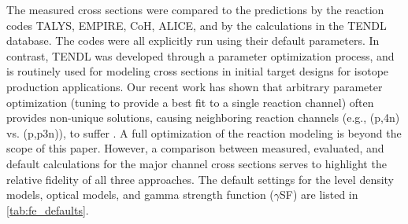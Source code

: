 The measured cross sections were compared to the predictions by the reaction codes TALYS, EMPIRE, CoH, ALICE, and by the calculations in the TENDL database.
The codes were all explicitly run using their default parameters.
In contrast, TENDL was developed through a parameter optimization process, and is routinely used for modeling cross sections in initial target designs for isotope production applications.  
Our recent work has shown that  arbitrary parameter optimization (tuning to provide a best fit to a single reaction channel)  often provides non-unique solutions, causing neighboring reaction channels (e.g., (p,4n) vs. (p,p3n)), to suffer \cite{fox2020investigating}.
A full optimization of the reaction modeling is beyond the scope of this paper.  
However, a  comparison between measured, evaluated, and default calculations for the major channel cross sections serves to highlight the relative fidelity of all three approaches.  
%
The default settings for the level density models, optical models, and gamma strength function ($\gamma$SF) are listed in  \autoref{tab:fe_defaults}.
